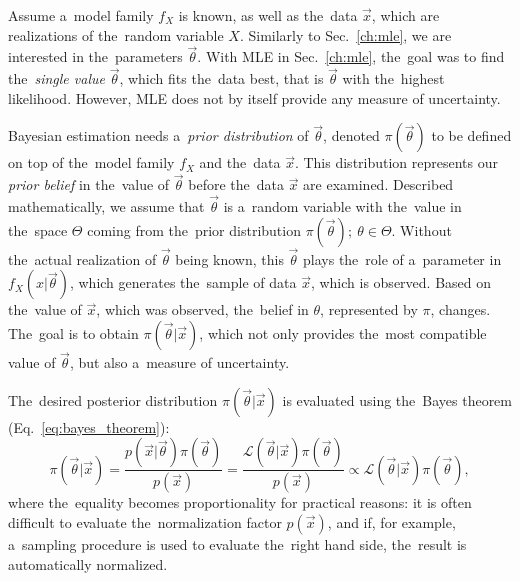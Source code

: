 Assume a~model family $f_X$ is known, as well as the~data $\vec{x}$, which are realizations of the~random variable $X$. Similarly to Sec.~\ref{ch:mle}, we are interested in the~parameters $\vec{\theta}$. With MLE in Sec.~\ref{ch:mle}, the~goal was to find the~\textit{single value} $\vec{\theta}$, which fits the~data best, that is $\vec{\theta}$ with the~highest likelihood. However, MLE does not by itself provide any measure of uncertainty. 

Bayesian estimation needs a~\textit{prior distribution} of $\vec{\theta}$, denoted $\pi(\vec{\theta})$ to be defined on top of the~model family $f_X$ and the~data $\vec{x}$. This distribution represents our \textit{prior belief} in the~value of $\vec{\theta}$ before the~data $\vec{x}$ are examined. Described mathematically, we assume that $\vec{\theta}$ is a~random variable with the~value in the~space $\Theta$ coming from the~prior distribution $\pi(\vec{\theta}); \ \theta \in \Theta$. Without the~actual realization of $\vec{\theta}$ being known, this $\vec{\theta}$ plays the~role of a~parameter in $f_X(x|\vec{\theta})$, which generates the~sample of data $\vec{x}$, which is observed. Based on the~value of $\vec{x}$, which was observed, the~belief in $\theta$, represented by $\pi$, changes. The~goal is to obtain $\pi(\vec{\theta}|\vec{x})$, which not only provides the~most compatible value of $\vec{\theta}$, but also a~measure of uncertainty. 

The~desired posterior distribution $\pi(\vec{\theta}|\vec{x})$ is evaluated using the~Bayes theorem (Eq.~\ref{eq:bayes_theorem}):
\begin{equation}
    \pi(\vec{\theta}|\vec{x}) = \frac{p(\vec{x}|\vec{\theta}) \pi(\vec{\theta})}{p(\vec{x})} = \frac{\mathcal{L}(\vec{\theta}|\vec{x}) \pi(\vec{\theta})}{p(\vec{x})} \propto \mathcal{L}(\vec{\theta}|\vec{x}) \pi(\vec{\theta}),
    \label{eq:bayesian_inference}
\end{equation}
where the~equality becomes proportionality for practical reasons: it is often difficult to evaluate the~normalization factor $p(\vec{x})$, and if, for example, a~sampling procedure is used to evaluate the~right hand side, the~result is automatically normalized. 

